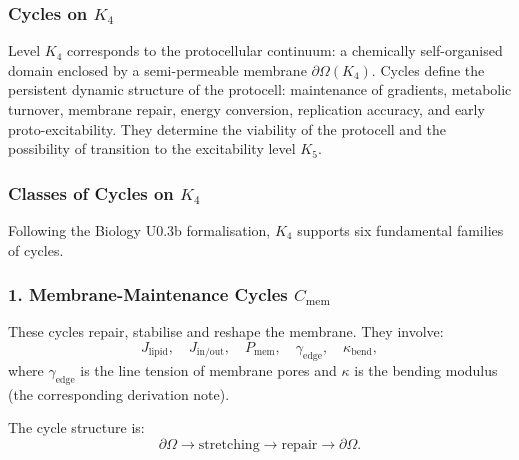 
\subsubsection{Cycles on \texorpdfstring{$K_4$}{K_4}}
\label{sec:cycles-k4}

Level $K_4$ corresponds to the protocellular continuum:
a chemically self-organised domain enclosed by a semi-permeable
membrane $\partial\Omega(K_4)$.
Cycles define the persistent dynamic structure of the protocell:
maintenance of gradients, metabolic turnover, membrane repair,
energy conversion, replication accuracy, and early proto-excitability.
They determine the viability of the protocell and the possibility
of transition to the excitability level $K_5$.

\subsubsection{Classes of Cycles on \texorpdfstring{$K_4$}{K_4}}

Following the Biology U0.3b formalisation, $K_4$ supports six
fundamental families of cycles.

\subsubsection{1. Membrane-Maintenance Cycles $C_{\mathrm{mem}}$}

These cycles repair, stabilise and reshape the membrane.
They involve:
\[
  J_{\mathrm{lipid}},\quad
  J_{\mathrm{in/out}},\quad
  P_{\mathrm{mem}},\quad
  \gamma_{\mathrm{edge}},\quad
  \kappa_{\mathrm{bend}},
\]
where $\gamma_{\mathrm{edge}}$ is the line tension of membrane pores
and $\kappa$ is the bending modulus (the corresponding derivation note).

The cycle structure is:
\[
  \partial\Omega \to
  \mathrm{stretching} \to
  \mathrm{repair} \to
  \partial\Omega.
\]

